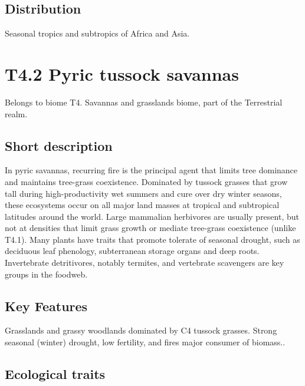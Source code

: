 \documentclass[
  letterpaper,
  DIV=11,
  numbers=noendperiod]{scrartcl}
\begin{document}
\subsection{Distribution}\label{distribution-83}

Seasonal tropics and subtropics of Africa and Asia.

\section{T4.2 Pyric tussock savannas}\label{t4.2-pyric-tussock-savannas}

Belongs to biome T4. Savannas and grasslands biome, part of the
Terrestrial realm.

\subsection{Short description}\label{short-description-84}

In pyric savannas, recurring fire is the principal agent that limits
tree dominance and maintains tree-grass coexistence. Dominated by
tussock grasses that grow tall during high-productivity wet summers and
cure over dry winter seasons, these ecosystems occur on all major land
masses at tropical and subtropical latitudes around the world. Large
mammalian herbivores are usually present, but not at densities that
limit grass growth or mediate tree-grass coexistence (unlike T4.1). Many
plants have traits that promote tolerate of seasonal drought, such as
deciduous leaf phenology, subterranean storage organs and deep roots.
Invertebrate detritivores, notably termites, and vertebrate scavengers
are key groups in the foodweb.

\subsection{Key Features}\label{key-features-84}

Grasslands and grassy woodlands dominated by C4 tussock grasses. Strong
seasonal (winter) drought, low fertility, and fires major consumer of
biomass..

\subsection{Ecological traits}\label{ecological-traits-84}
\end{document}
